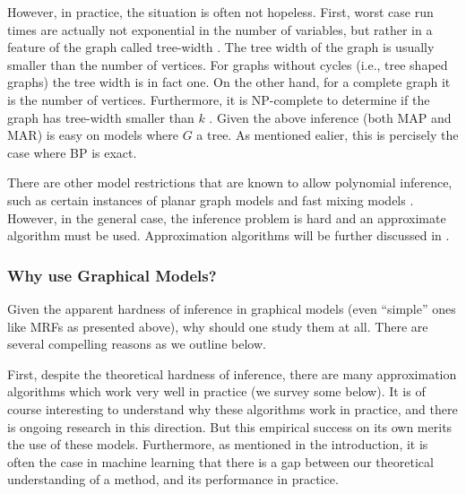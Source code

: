 However, in practice, the situation is often not hopeless. First, worst case run times are actually not exponential in the number of variables, but rather in a feature of the graph called tree-width \cite{robertson1983graph,robertson1994quickly}.
The tree width of the graph is usually smaller than the number of vertices. For graphs without cycles (i.e., tree shaped graphs) the tree width is in fact one. On the other hand, for a complete graph it is the number of vertices. Furthermore, it is NP-complete to determine if the graph has tree-width smaller than $k$ \cite{Arnborg:1987}.
Given the above inference (both MAP and MAR) is easy on models where $G$ a tree. As mentioned ealier, this is percisely the case where BP is exact.

There are other model restrictions that are known to allow polynomial
inference, such as certain instances of planar graph models \cite{jaakkola2007approximate} and
fast mixing models \cite{jerrum1993polynomial}.  However, in the
general case, the inference problem is hard and an approximate
algorithm must be used. Approximation algorithms will be further discussed in
.

\subsubsection{Why use Graphical Models?}
 
Given the apparent hardness of inference in graphical models (even ``simple'' ones like MRFs as presented above), why should
one study them at all. There are several compelling reasons as we outline below.

First, despite the theoretical hardness of inference, there are many approximation algorithms which work very well in practice (we survey some below). It is of course interesting to understand why these algorithms work in practice, and there is ongoing research in this direction. But this empirical success on its own merits the use of these models. Furthermore, as mentioned in the introduction, it is often the case in machine learning that there is a gap between our theoretical understanding of a method, and its performance in practice.

